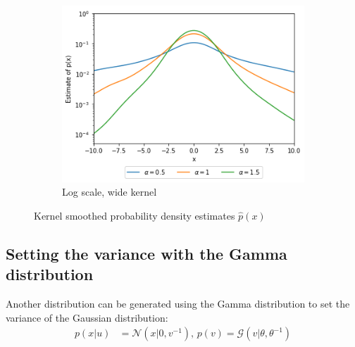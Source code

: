 \documentclass[a4paper]{article}
\begin{document}
\begin{figure}[h]
    \hfill
    \begin{subfigure}[b]{0.3\textwidth}
        \centering
        \includegraphics[width=\textwidth]{figures/exponential_sampled_gaussian_kernel_smoothed_log_wide.png}
        \caption{Log scale, wide kernel}
        \label{fig:exponential_sampled_gaussian_kernel_smoothed_log_wide}
    \end{subfigure}
    \caption{Kernel smoothed probability density estimates $\hat{p}(x)$}
    \label{fig:exponential_sampled_gaussian_kernel_smoothed}
\end{figure}


\subsection{Setting the variance with the Gamma distribution}

Another distribution can be generated using the Gamma distribution to set the variance of the Gaussian distribution:
\begin{align}\label{eq:gamma_sampled_gaussian}
    p(x|u) &= \mathcal{N}(x|0, v^{-1}), \, p(v) = \mathcal{G}(v|\theta, \theta^{-1})
\end{align}
\end{document}

